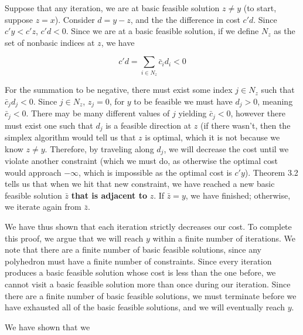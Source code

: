\documentclass[11pt,a4paper]{article}
\begin{document}
Suppose that any iteration, we are at basic feasible solution $z\neq y$ (to start, suppose $z=x$). Consider $d=y-z$, and the the difference in cost $c'd$. Since $c'y<c'z$, $c'd<0$. Since we are at a basic feasible solution, if we define $N_z$ as the set of nonbasic indices at $z$, we have 

$$
c'd=\sum_{i\in N_z}\bar{c}_id_i<0
$$

For the summation to be negative, there must exist some index $j\in N_z$ such that $\bar{c}_jd_j<0$. Since $j\in N_z$, $z_j=0$, for $y$ to be feasible we must have $d_j>0$, meaning $\bar{c}_j<0$. There may be many different values of $j$ yielding $\bar{c}_j<0$, however there must exist one such that $d_j$ is a feasible direction at $z$ (if there wasn't, then the simplex algorithm would tell us that $z$ is optimal, which it is not because we know $z\neq y$. Therefore, by traveling along $d_j$, we will decrease the cost until we violate another constraint (which we must do, as otherwise the optimal cost would   approach $-\infty$, which is impossible as the optimal cost is $c'y$). Theorem 3.2 tells us that when we hit that new constraint, we have reached a new basic feasible solution $\bar{z}$ \textbf{that is adjacent to} $z$. If $\bar{z}=y$, we have finished; otherwise, we iterate again from $\bar{z}$.

We have thus shown that each iteration strictly decreases our cost. To complete this proof, we argue that we will reach $y$ within a finite number of iterations. We note that there are a finite number of basic feasible solutions, since any polyhedron must have a finite number of constraints. Since every iteration produces a basic feasible solution whose cost is less than the one before, we cannot visit a basic feasible solution more than once during our iteration. Since there are a finite number of basic feasible solutions, we must terminate before we have exhausted all of the basic feasible solutions, and we will eventually reach $y$.

We have shown that we 
\end{document}
